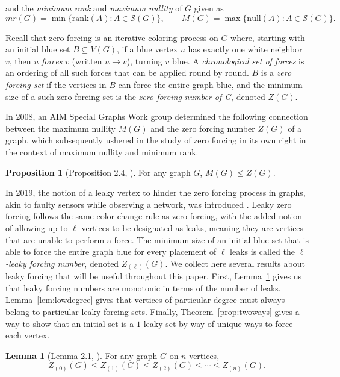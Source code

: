 \documentclass[11pt]{article}
\theoremstyle{plain} \newtheorem{question}{Question}
\theoremstyle{definition}
\newtheorem{prop}[thm]{Proposition}
\newtheorem{lem}[thm]{Lemma}
\begin{document}
\noindent and the \emph{minimum rank} and \emph{maximum nullity} of $G$ given as
\[
mr(G)=\min\{\text{rank}(A) : A\in \mathcal{S}(G)\},\qquad
M(G)=\max\{\text{null}(A) : A\in \mathcal{S}(G)\}  .
\]

Recall that zero forcing is an iterative coloring process on $G$ where, starting with an initial blue set $B\subseteq V(G)$, if a blue vertex $u$ has exactly one white neighbor $v$, then $u$ \emph{forces} $v$ (written $u\to v$), turning $v$ blue. A \emph{chronological set of forces} is an ordering of all such forces that can be applied round by round. $B$ is a \emph{zero forcing set} if the vertices in $B$ can force the entire graph blue, and the minimum size of a such zero forcing set is the \emph{zero forcing number of G}, denoted $Z(G)$. 


In 2008, an AIM Special Graphs Work group determined the following connection between the maximum nullity $M(G)$ and the zero forcing number $Z(G)$ of a graph, which subsequently ushered in the study of zero forcing in its own right in the context of maximum nullity and minimum rank.   

\begin{prop}[Proposition 2.4, \cite{AIMMINIMUMRANKWorkgroup}]\label{thm:NullityInequality}
    For any graph $G$, $M(G)\le Z(G)$.
\end{prop}


In 2019, the notion of a leaky vertex to hinder the zero forcing process in graphs, akin to faulty sensors while observing a network, was introduced \cite{KenterOGpaper}. Leaky zero forcing follows the same color change rule as zero forcing, with the added notion of allowing up to $\ell$ vertices to be designated as leaks, meaning they are vertices that are unable to perform a force. The minimum size of an initial blue set that is able to force the entire graph blue for every placement of $\ell$ leaks is called the \emph{$\ell$-leaky forcing number}, denoted $Z_{(\ell)}(G)$. We collect here several results about leaky forcing that will be useful throughout this paper. First, Lemma~\ref{lem:moreleaksinq} gives us that leaky forcing numbers are monotonic in terms of the number of leaks. Lemma~\ref{lem:lowdegree} gives that vertices of particular degree must always belong to particular leaky forcing sets. Finally, Theorem~\ref{prop:twoways} gives a way to show that an initial set is a $1$-leaky set by way of unique ways to force each vertex. 

\begin{lem}[Lemma 2.1, \cite{KenterOGpaper}]
\label{lem:moreleaksinq}
For any graph $G$ on $n$ vertices,
\[  
Z_{(0)}(G) \leq Z_{(1)}(G) \leq Z_{(2)}(G) \leq \cdots \leq Z_{(n)}(G).  
\]
\end{lem}
\end{document}
